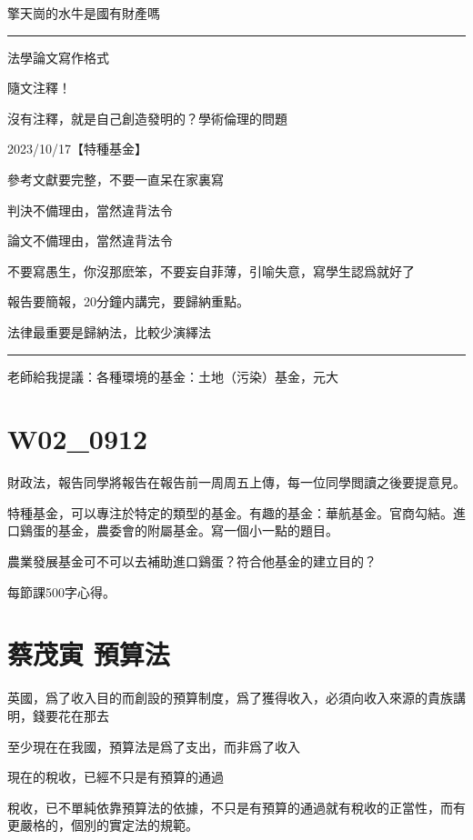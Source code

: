 \documentclass[]{book}
\begin{document}
擎天崗的水牛是國有財產嗎

\begin{center}\rule{0.5\linewidth}{0.5pt}\end{center}

法學論文寫作格式

隨文注釋！

沒有注釋，就是自己創造發明的？學術倫理的問題

2023/10/17【特種基金】

參考文獻要完整，不要一直呆在家裏寫

判決不備理由，當然違背法令

論文不備理由，當然違背法令

不要寫愚生，你沒那麽笨，不要妄自菲薄，引喻失意，寫學生認爲就好了

報告要簡報，20分鐘内講完，要歸納重點。

法律最重要是歸納法，比較少演繹法

\begin{center}\rule{0.5\linewidth}{0.5pt}\end{center}

老師給我提議：各種環境的基金：土地（污染）基金，元大

\hypertarget{ux7b2cux4e8cux5468}{%
\chapter{W02\_0912}\label{ux7b2cux4e8cux5468}}

財政法，報告同學將報告在報告前一周周五上傳，每一位同學閲讀之後要提意見。

特種基金，可以專注於特定的類型的基金。有趣的基金：華航基金。官商勾結。進口鷄蛋的基金，農委會的附屬基金。寫一個小一點的題目。

農業發展基金可不可以去補助進口鷄蛋？符合他基金的建立目的？

每節課500字心得。

\hypertarget{ux8521ux8302ux5bc5-ux9810ux7b97ux6cd5}{%
\chapter{蔡茂寅 預算法}\label{ux8521ux8302ux5bc5-ux9810ux7b97ux6cd5}}

英國，爲了收入目的而創設的預算制度，爲了獲得收入，必須向收入來源的貴族講明，錢要花在那去

至少現在在我國，預算法是爲了支出，而非爲了收入

現在的稅收，已經不只是有預算的通過

稅收，已不單純依靠預算法的依據，不只是有預算的通過就有稅收的正當性，而有更嚴格的，個別的實定法的規範。
\end{document}

